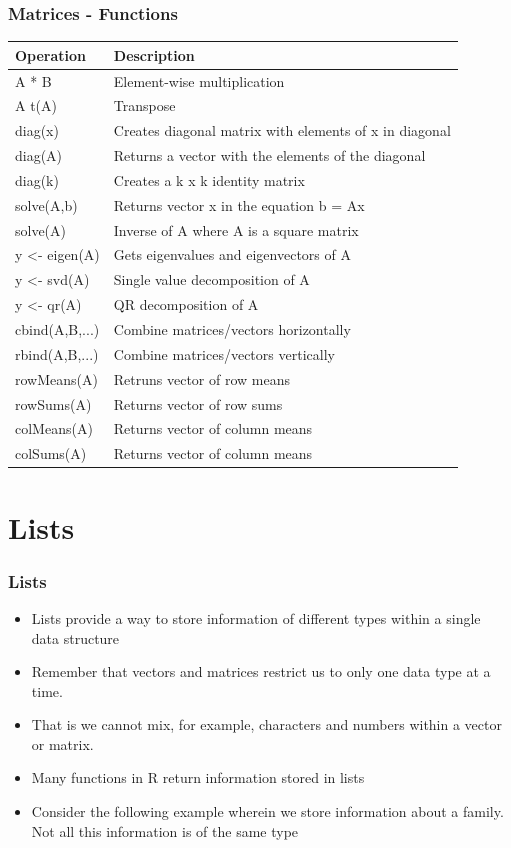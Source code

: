 \documentclass{beamer}
\begin{document}
\begin{frame}[fragile]
\frametitle{Matrices - Functions}
\begin{center}
\footnotesize
\begin{tabular}{| l | l |}
  \hline     
  \textbf{Operation} & \textbf{Description} \\ \hline
  A * B & Element-wise multiplication \\ \hline
  A %
  t(A) & Transpose \\ \hline
  diag(x) & Creates diagonal matrix with elements of x in diagonal \\ \hline
  diag(A) & Returns a vector with the elements of the diagonal \\ \hline
  diag(k) & Creates a k x k identity matrix \\ \hline
  solve(A,b) & Returns vector x in the equation b = Ax \\ \hline
  solve(A) & Inverse of A where A is a square matrix \\ \hline
  y <- eigen(A) & Gets eigenvalues and eigenvectors of A \\ \hline
  y <- svd(A) & Single value decomposition of A \\ \hline
  y <- qr(A) & QR decomposition of A \\ \hline
  cbind(A,B,...) & Combine matrices/vectors horizontally \\ \hline
  rbind(A,B,...) & Combine matrices/vectors vertically \\ \hline
  rowMeans(A) & Retruns vector of row means \\ \hline
  rowSums(A) & Returns vector of row sums \\ \hline
  colMeans(A) & Returns vector of column means \\ \hline
  colSums(A) & Returns vector of column means \\ \hline
\end{tabular}
\end{center}
\end{frame}

\section{Lists}


%
\begin{frame}[fragile]
\frametitle{Lists}
\begin{itemize}
\item Lists provide a way to store information of different 
   types within a single data structure 
\item Remember that vectors and matrices restrict us to only one data type at a time. 
\item That is we cannot mix, for example, characters and numbers within a vector or matrix. 
\item Many functions in R return information stored in lists
\item Consider the following example wherein we store information about a family. Not all this 
information is of the same type
\end{itemize}
\end{frame}
\end{document}
